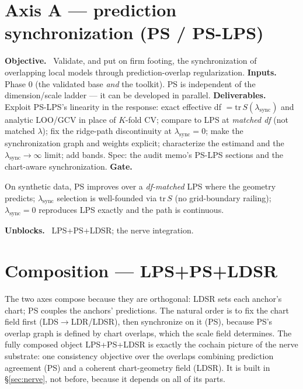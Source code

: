 \documentclass[11pt]{article}
\newcommand{\field}[1]{\smallskip\noindent\textbf{\textsf{#1.}}\ }
\begin{document}
\section{Axis A --- prediction synchronization (PS / PS-LPS)}\label{sec:ps}

\field{Objective} Validate, and put on firm footing, the synchronization of
overlapping local models through prediction-overlap regularization.
\field{Inputs} Phase 0 (the validated base \emph{and} the toolkit). PS is independent
of the dimension/scale ladder --- it can be developed in parallel.
\field{Deliverables} Exploit PS-LPS's linearity in the response: exact effective
df $=\mathrm{tr}\,S(\lambda_{\mathrm{sync}})$ and analytic LOO/GCV in place of
$K$-fold CV; compare to LPS at \emph{matched df} (not matched $\lambda$); fix the
ridge-path discontinuity at $\lambda_{\mathrm{sync}}=0$; make the synchronization
graph and weights explicit; characterize the estimand and the
$\lambda_{\mathrm{sync}}\to\infty$ limit; add bands. Spec: the audit memo's PS-LPS
sections and the chart-aware synchronization.
\field{Gate} \begin{gate} On synthetic data, PS improves over a \emph{df-matched}
LPS where the geometry predicts; $\lambda_{\mathrm{sync}}$ selection is well-founded
via $\mathrm{tr}\,S$ (no grid-boundary railing); $\lambda_{\mathrm{sync}}=0$
reproduces LPS exactly and the path is continuous.\end{gate}
\field{Unblocks} LPS+PS+LDSR; the nerve integration.

\section{Composition --- LPS+PS+LDSR}\label{sec:compose}

The two axes compose because they are orthogonal: LDSR sets each anchor's chart;
PS couples the anchors' predictions. The natural order is to fix the chart field
first (LDS$\to$LDR/LDSR), then synchronize on it (PS), because PS's overlap graph is
defined by chart overlaps, which the scale field determines. The fully composed
object LPS+PS+LDSR is exactly the cochain picture of the nerve substrate: one
consistency objective over the overlaps combining prediction agreement (PS) and a
coherent chart-geometry field (LDSR). It is built in \S\ref{sec:nerve}, not before,
because it depends on all of its parts.
\end{document}
